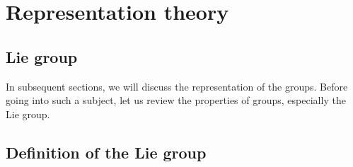 \documentclass[a4paper,pdftex,10pt]{report}
\begin{document}
\maketitle

\tableofcontents

\clearpage
\chapter{Representation theory}



\section{Lie group}

In subsequent sections, we will discuss the representation of the groups. Before going into such a subject, let us review the properties of groups, especially the Lie group.

\section{Definition of the Lie group}





















\clearpage



\nocite{Humphreys:1972}

\end{document}
